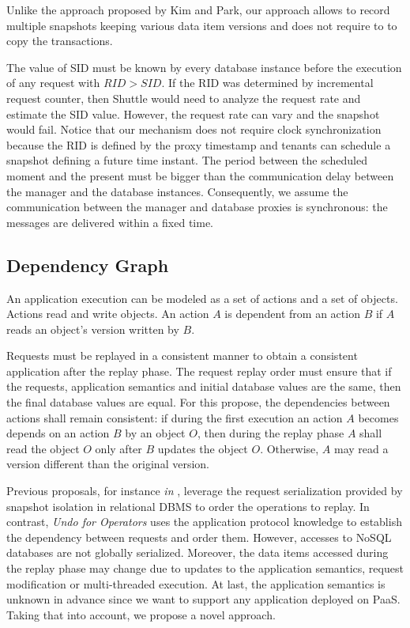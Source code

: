 Unlike the approach proposed by Kim and Park, our approach allows to record multiple snapshots keeping various data item versions and does not require to to copy the transactions.

The value of \ac{SID} must be known by every database instance before the execution of any request with $RID > SID$. If the \ac{RID} was determined by incremental request counter, then Shuttle would need to analyze the request rate and estimate the \ac{SID} value. However, the request rate can vary and the snapshot would fail. Notice that our mechanism does not require clock synchronization because the \ac{RID} is defined by the proxy timestamp and tenants can schedule a snapshot defining a future time instant. The period between the scheduled moment and the present must be bigger than the communication delay between the manager and the database instances. Consequently, we assume the communication between the manager and database proxies is synchronous: the messages are delivered within a fixed time.


\subsection{Dependency Graph}
\label{sec:arch:dependencies}
An application execution can be modeled as a set of actions and a set of objects. Actions read and write objects. An action $A$ is dependent from an action $B$ if $A$ reads an object's version written by $B$.

Requests must be replayed in a consistent manner to obtain a consistent application after the replay phase. The request replay order must ensure that if the requests, application semantics and initial database values are the same, then the final database values are equal. For this propose, the dependencies between actions shall remain consistent: if during the first execution an action $A$ becomes depends on an action $B$ by an object $O$, then during the replay phase $A$ shall read the object $O$ only after $B$ updates the object $O$. Otherwise, $A$ may read a version different than the original version.

Previous proposals, for instance \emph{in} \cite{goel}, leverage the request serialization provided by snapshot isolation in relational \ac{DBMS} to order the operations to replay. In contrast, \textit{Undo for Operators} \cite{undoForOperators} uses the application protocol knowledge to establish the dependency between requests and order them. However, accesses to \acs{NoSQL} databases are not globally serialized. Moreover, the data items accessed during the replay phase may change due to updates to the application semantics, request modification or multi-threaded execution. At last, the application semantics is unknown in advance since we want to support any application deployed on \ac{PaaS}. Taking that into account, we propose a novel approach.\\


